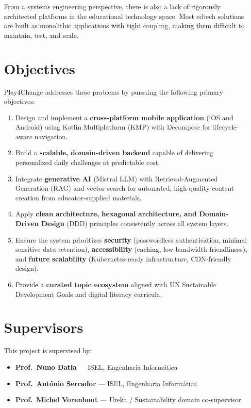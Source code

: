 From a systems engineering perspective, there is also a lack of rigorously architected platforms in the educational technology space. Most edtech solutions are built as monolithic applications with tight coupling, making them difficult to maintain, test, and scale.

\section{Objectives}
\label{sec:objectives}

Play4Change addresses these problems by pursuing the following primary objectives:

\begin{enumerate}
    \item Design and implement a \textbf{cross-platform mobile application} (iOS and Android) using Kotlin Multiplatform (KMP) with Decompose for lifecycle-aware navigation.
    \item Build a \textbf{scalable, domain-driven backend} capable of delivering personalized daily challenges at predictable cost.
    \item Integrate \textbf{generative AI} (Mistral LLM) with Retrieval-Augmented Generation (RAG) and vector search for automated, high-quality content creation from educator-supplied materials.
    \item Apply \textbf{clean architecture, hexagonal architecture, and Domain-Driven Design} (DDD) principles consistently across all system layers.
    \item Ensure the system prioritizes \textbf{security} (passwordless authentication, minimal sensitive data retention), \textbf{accessibility} (caching, low-bandwidth friendliness), and \textbf{future scalability} (Kubernetes-ready infrastructure, CDN-friendly design).
    \item Provide a \textbf{curated topic ecosystem} aligned with UN Sustainable Development Goals and digital literacy curricula.
\end{enumerate}

\section{Supervisors}
\label{sec:supervisors}

This project is supervised by:
\begin{itemize}
    \item \textbf{Prof.\ Nuno Datia} — ISEL, Engenharia Informática
    \item \textbf{Prof.\ António Serrador} — ISEL, Engenharia Informática
    \item \textbf{Prof.\ Michel Vorenhout} — Ureka / Sustainability domain co-supervisor
\end{itemize}

